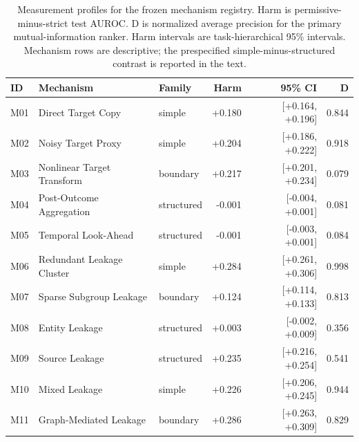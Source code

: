 \begin{table}[t]
\caption{Measurement profiles for the frozen mechanism registry. Harm is permissive-minus-strict test AUROC. D is normalized average precision for the primary mutual-information ranker. Harm intervals are task-hierarchical 95\% intervals. Mechanism rows are descriptive; the prespecified simple-minus-structured contrast is reported in the text.}
\label{tab:measurement}
\centering\small
\begin{tabular}{lllrrr}
\toprule
ID & Mechanism & Family & Harm & 95\% CI & D \\
\midrule
M01 & Direct Target Copy & simple & +0.180 & [+0.164, +0.196] & 0.844 \\
M02 & Noisy Target Proxy & simple & +0.204 & [+0.186, +0.222] & 0.918 \\
M03 & Nonlinear Target Transform & boundary & +0.217 & [+0.201, +0.234] & 0.079 \\
M04 & Post-Outcome Aggregation & structured & -0.001 & [-0.004, +0.001] & 0.081 \\
M05 & Temporal Look-Ahead & structured & -0.001 & [-0.003, +0.001] & 0.084 \\
M06 & Redundant Leakage Cluster & simple & +0.284 & [+0.261, +0.306] & 0.998 \\
M07 & Sparse Subgroup Leakage & boundary & +0.124 & [+0.114, +0.133] & 0.813 \\
M08 & Entity Leakage & structured & +0.003 & [-0.002, +0.009] & 0.356 \\
M09 & Source Leakage & structured & +0.235 & [+0.216, +0.254] & 0.541 \\
M10 & Mixed Leakage & simple & +0.226 & [+0.206, +0.245] & 0.944 \\
M11 & Graph-Mediated Leakage & boundary & +0.286 & [+0.263, +0.309] & 0.829 \\
\bottomrule
\end{tabular}
\end{table}

